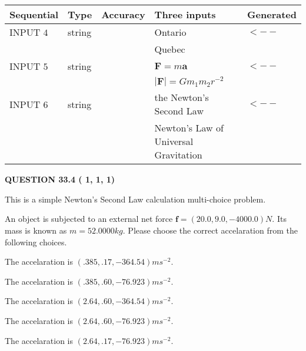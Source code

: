 \documentclass[12pt]{article}
\begin{document}
   
  
  
\noindent\begin{tabular}{|l|l|l|l|l|}
\hline
 Sequential & Type & Accuracy & Three inputs & Generated \\ 
\hline
 
 
  INPUT $           4$ & string & & 
 Ontario & 
  $ <-- $ 
  \\
  & & & 
 Quebec & 
 \\  \hline  
 
 
  INPUT $           5$ & string & & 
 $\mathbf{F}=m\mathbf{a}$ & 
  $ <-- $ 
  \\
  & & & 
 $\left| \mathbf{F}\right| =Gm_1m_2r^{-2}$ & 
 \\  \hline  
 
 
  INPUT $           6$ & string & & 
 the Newton's Second Law & 
  $ <-- $ 
  \\
  & & & 
 Newton's Law of Universal Gravitation & 
 \\  \hline  
 \end{tabular}
   
   
  
\vspace{0.2in}
  
{\textbf{\Large{QUESTION
33.4 
 (          1,          1,          1)
}}}
  
  


\noindent{}
This is a simple Newton's Second Law calculation multi-choice problem.  
\noindent{}


 
 
An object is subjected to an external net force $\mathbf{f}=
(20.0 , 9.0 , -4000.0) N$.
Its mass is known as $m= %
52.0000 kg$. Please choose the
correct accelaration from the following choices.
 
 
 
The accelaration is $  %
(
.385,
.17,
-364.54)
ms^{-2} $.
 
 
The accelaration is $  %
(
.385,
.60,
-76.923)
ms^{-2} $.
 
 
The accelaration is $  %
(
2.64,
.60,
-364.54)
ms^{-2} $.
 
 
The accelaration is $  %
(
2.64,
.60,
-76.923)
ms^{-2} $.
 
 
The accelaration is $  %
(
2.64,
.17,
-76.923)
ms^{-2} $.
 
\end{document}
